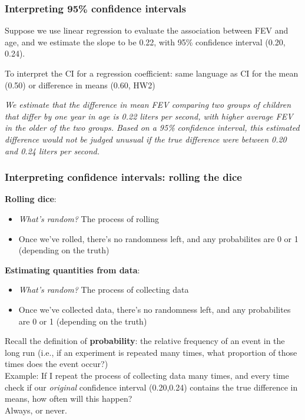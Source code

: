 \documentclass[12pt, 
hyperref={colorlinks=true, linkcolor=blue, urlcolor=cyan},dvipsnames]{beamer}
\begin{document}
\begin{frame}
\frametitle{Interpreting 95\% confidence intervals}

Suppose we use linear regression to evaluate the association between FEV and age, and we estimate the slope to be 0.22, with 95\% confidence interval (0.20, 0.24).

To interpret the CI for a regression coefficient: same language as CI for the mean (0.50) or difference in means (0.60, HW2)

\textit{We estimate that the difference in mean FEV comparing two groups of children that differ by one year in age is 0.22 liters per second, with higher average FEV in the older of the two groups. \color{blue} Based on a 95\% confidence interval, this estimated difference would not be judged unusual if the true difference were between 0.20 and 0.24 liters per second. \color{black}}
\end{frame}

\begin{frame}
\frametitle{Interpreting confidence intervals: rolling the dice}

\textbf{Rolling dice}:\vspace{-0.3cm}
\begin{itemize}
\item \textit{What's random?} The process of rolling
\item Once we've rolled, there's no randomness left, and any probabilites are 0 or 1 (depending on the truth)
\end{itemize}

\pause
\textbf{Estimating quantities from data}:\vspace{-0.3cm}
\begin{itemize}
\item \textit{What's random?} The process of collecting data
\item Once we've collected data, there's no randomness left, and any probabilites are 0 or 1 (depending on the truth)
\end{itemize}

\pause
\begin{small}
Recall the definition of \textbf{probability}: the relative frequency of an event in the long run (i.e., if an experiment is repeated many times, what proportion of those times does the event occur?)\\ \pause
\color{blue} Example: \color{black} If I repeat the process of collecting data many times, and every time check if our \textit{original} confidence interval (0.20,0.24) contains the true difference in means, how often will this happen?\\ \pause \hfill \color{red} Always, or never.
\end{small}

\end{frame}
\end{document}
